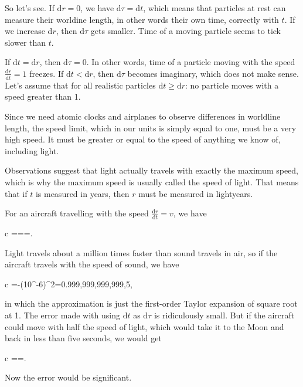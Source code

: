 \documentclass[11pt,oneside%
]{memoir}
\newenvironment{eqna}{\begin{IEEEeqnarray*}{c}}{\end{IEEEeqnarray*}\ignorespacesafterend}
\newcommand{\der}[2]{\frac{\dd#1}{\dd#2}}
\newcommand{\dd}{\mathrm{d}}
\begin{document}
So let's see. If \(\dd r=0\), we have \(\dd\tau=\dd t\), which means that particles at rest can measure their worldine length, in other words their own time, correctly with \(t\). If we increase \(\dd r\), then \(\dd\tau\) gets smaller. Time of a moving particle seems to tick slower than \(t\).

If \(\dd t=\dd r\), then \(\dd\tau=0\). In other words, time of a particle moving with the speed \(\frac{\dd r}{\dd t}=1\) freezes. If \(\dd t <\dd r\), then \(\dd\tau\) becomes imaginary, which does not make sense. Let's assume that for all realistic particles \(\dd t \geq\dd r\): no particle moves with a speed greater than 1.

Since we need atomic clocks and airplanes to observe differences in worldline length, the speed limit, which in our units is simply equal to one, must be a very high speed. It must be greater or equal to the speed of anything we know of, including light.

Observations suggest that light actually travels with exactly the maximum speed, which is why the maximum speed is usually called the speed of light. That means that if \(t\) is measured in years, then \(r\) must be measured in lightyears.

For an aircraft travelling with the speed \(\der{r}{t}=v\), we have
\begin{eqna}
\der{\tau}{t}=\frac{\sqrt{\dd t^2-\dd r^2}}{\dd t^2}=\sqrt{1-\left(\der{r}{t}\right)^2}=.
\end{eqna}
Light travels about a million times faster than sound travels in air, so if the aircraft travels with the speed of sound, we have
\begin{eqna}
\der{\tau}{t}=-\left(10^{-6}\right)^2=0.999,999,999,999,5,
\end{eqna}
in which the approximation is just the first-order Taylor expansion of square root at 1. The error made with using \(\dd t\) as \(\dd\tau\) is ridiculously small. But if the aircraft could move with half the speed of light, which would take it to the Moon and back in less than five seconds, we would get
\begin{eqna}
\der{\tau}{t}==.
\end{eqna}
Now the error would be significant.

\end{document}
